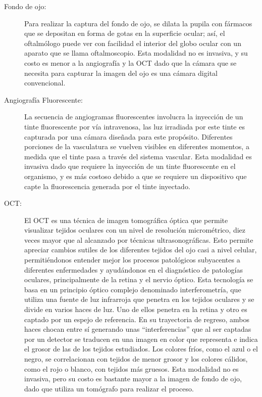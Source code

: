 \begin{description}
\item[Fondo de ojo:] Para realizar la captura del fondo de ojo, se dilata la pupila con fármacos que se depositan en forma de gotas en la superficie ocular; así, el oftalmólogo puede ver con facilidad el interior del globo ocular con un aparato que se llama oftalmoscopio. Esta modalidad no es invasiva, y su costo es menor a la angiografía y la OCT dado que la cámara que se necesita para capturar la imagen del ojo es una cámara digital convencional.

\item[Angiografía Fluorescente:] La secuencia de angiogramas fluorescentes involucra la inyección de un tinte fluorescente por vía intravenosa, las luz irradiada por este tinte es capturada por una c\'amara diseñada para este prop\'osito. Diferentes porciones de la vasculatura se vuelven visibles en diferentes momentos, a medida que el tinte pasa a través del sistema vascular.  Esta modalidad es invasiva dado que requiere la inyección de  un tinte fluorescente en el organismo, y es más costoso debido a que se requiere un dispositivo que capte la fluorescencia generada por el tinte inyectado.


\item[OCT:] El OCT es una técnica de imagen tomográfica óptica que permite visualizar tejidos oculares con un nivel de resolución micrométrico, diez veces mayor que al alcanzado por técnicas ultrasonográficas. Esto permite apreciar cambios sutiles de los diferentes tejidos del ojo casi a nivel celular, permitiéndonos entender mejor los procesos patológicos subyacentes a diferentes enfermedades y ayudándonos en el diagnóstico de patologías oculares, principalmente de la retina y el nervio óptico. 
Esta tecnología se basa en un principio óptico complejo denominado interferometría, que utiliza una fuente de luz infrarroja que penetra en los tejidos oculares y se divide en varios haces de luz. Uno de ellos penetra en la retina y otro es captado por un espejo de referencia. En su trayectoria de regreso, ambos haces chocan entre sí generando unas “interferencias” que al ser captadas por un detector se traducen en una imagen en color que representa e indica el grosor de las de los tejidos estudiados. Los colores fríos, como el azul o el negro, se correlacionan con tejidos de menor grosor y los colores cálidos, como el rojo o blanco, con tejidos más gruesos.
Esta modalidad no es invasiva, pero su costo es bastante mayor a la imagen de fondo de ojo, dado que utiliza un tom\'ografo para realizar el proceso.
\end{description}

